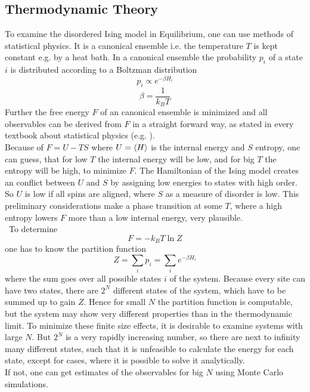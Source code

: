 \subsection{Thermodynamic Theory}
\label{ssec:theory}
    To examine the disordered Ising model in Equilibrium, one can use
    methods of statistical physics. It is a canonical ensemble i.e. the
    temperature \(T\) is kept constant e.g. by a heat bath.
    In a canonical ensemble the probability \(p_i\) of a state
    \(i\) is distributed according to a Boltzman distribution
    \begin{equation}
        p_i \propto e^{-\beta H_i}
    \end{equation}
    \begin{equation}
        \beta = \frac{1}{k_B T}
    \end{equation}
    Further the free energy \(F\) of an canonical
    ensemble is minimized and all observables can be derived from \(F\)
    in a straight forward way, as stated in every textbook about
    statistical physics (e.g. \cite{nolting2005}).\\
    Because of \(F=U-TS\) where \(U=\left< H \right>\) is the internal energy and
    \(S\) entropy, one can guess, that for low \(T\) the internal energy
    will be low, and for big \(T\) the entropy will be high, to minimize
    \(F\). The Hamiltonian of the Ising model creates an conflict between
    \(U\) and \(S\) by assigning low energies to states with high order.
    So \(U\) is low if all spins are aligned, where \(S\) as a measure of
    disorder is low. This preliminary considerations make a phase
    transition at some \(T\), where a high entropy lowers \(F\) more than
    a low internal energy, very plausible.\\\
    To determine
    \begin{equation}
        F=-k_{B}T \ln{Z}
    \end{equation}
    one has to know the partition function
    \begin{equation}
        Z = \sum_i p_i = \sum_i e^{-\beta H_i}
    \end{equation}
    where the sum goes over all possible states \(i\) of the system.
    Because every site can have two states, there are \(2^N\) different
    states of the system, which have to be summed up to gain \(Z\).
    Hence for small \(N\) the partition function is computable, but the system
    may show very different properties than in the thermodynamic limit.
    To minimize these finite size effects, it is desirable to examine
    systems with large \(N\). But \(2^N\) is a very rapidly increasing
    number, so there are next to infinity many different states, such
    that it is unfeasible to calculate the energy for each state, except
    for cases, where it is possible to solve it analytically.\\
    If not, one can get estimates of the observables for big \(N\) using
    Monte Carlo simulations.\\

